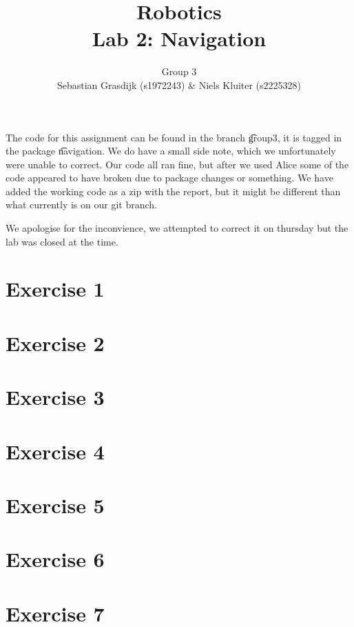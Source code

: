 \documentclass[a4paper]{article}
\title{Robotics\\ Lab 2: Navigation}
\author{Group 3\\Sebastian Grasdijk (s1972243) \& Niels Kluiter (s2225328)}
\begin{document}
\maketitle

\noindent The code for this assignment can be found in the branch \t{group3}, it is tagged in the package \t{navigation}. We do have a small side note, which we unfortunately were unable to correct. Our code all ran fine, but after we used Alice some of the code appeared to have broken due to package changes or something. We have added the working code as a zip with the report, but it might be different than what currently is on our git branch.

We apologise for the inconvience, we attempted to correct it on thursday but the lab was closed at the time.

\section*{Exercise 1}


\section*{Exercise 2}


\section*{Exercise 3}


\section*{Exercise 4}


\section*{Exercise 5}


\section*{Exercise 6}


\section*{Exercise 7}


\printbibliography

\clearpage
\appendix

\end{document}

